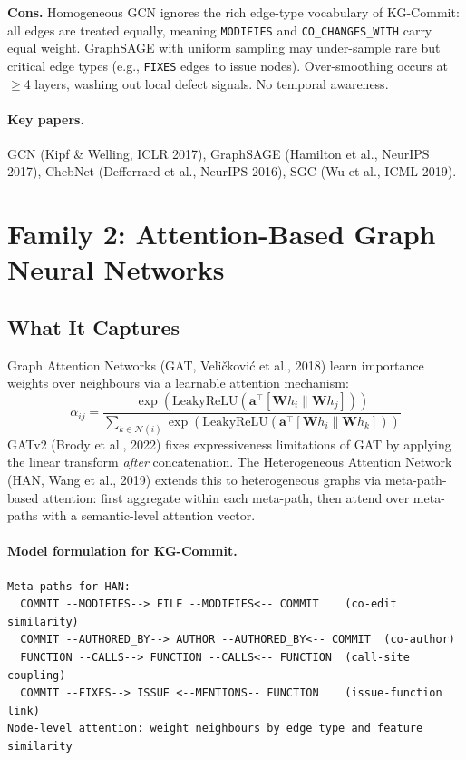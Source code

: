 \documentclass[12pt,a4paper]{article}
\begin{document}
\begin{consbox}
\textbf{Cons.}
Homogeneous GCN ignores the rich edge-type vocabulary of KG-Commit: all edges
are treated equally, meaning \texttt{MODIFIES} and \texttt{CO\_CHANGES\_WITH}
carry equal weight. GraphSAGE with uniform sampling may under-sample rare but
critical edge types (e.g., \texttt{FIXES} edges to issue nodes). Over-smoothing
occurs at $\geq$4 layers, washing out local defect signals. No temporal awareness.
\end{consbox}

\paragraph{Key papers.} GCN (Kipf \& Welling, ICLR 2017), GraphSAGE (Hamilton
et al., NeurIPS 2017), ChebNet (Defferrard et al., NeurIPS 2016), SGC (Wu et al.,
ICML 2019).

\section{Family 2: Attention-Based Graph Neural Networks}

\subsection{What It Captures}

Graph Attention Networks (GAT, Veli\v{c}kovi\'{c} et al., 2018) learn
importance weights over neighbours via a learnable attention mechanism:
\[
  \alpha_{ij} = \frac{\exp(\text{LeakyReLU}(\mathbf{a}^\top [\mathbf{W}h_i \| \mathbf{W}h_j]))}
                     {\sum_{k \in \mathcal{N}(i)} \exp(\text{LeakyReLU}(\mathbf{a}^\top [\mathbf{W}h_i \| \mathbf{W}h_k]))}
\]
GATv2 (Brody et al., 2022) fixes expressiveness limitations of GAT by applying
the linear transform \emph{after} concatenation. The Heterogeneous Attention
Network (HAN, Wang et al., 2019) extends this to heterogeneous graphs via
meta-path-based attention: first aggregate within each meta-path, then attend
over meta-paths with a semantic-level attention vector.

\paragraph{Model formulation for KG-Commit.}
\begin{lstlisting}
Meta-paths for HAN:
  COMMIT --MODIFIES--> FILE --MODIFIES<-- COMMIT    (co-edit similarity)
  COMMIT --AUTHORED_BY--> AUTHOR --AUTHORED_BY<-- COMMIT  (co-author)
  FUNCTION --CALLS--> FUNCTION --CALLS<-- FUNCTION  (call-site coupling)
  COMMIT --FIXES--> ISSUE <--MENTIONS-- FUNCTION    (issue-function link)
Node-level attention: weight neighbours by edge type and feature similarity
\end{lstlisting}
\end{document}
